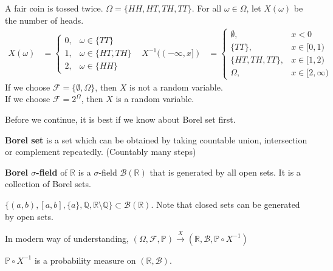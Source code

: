 \documentclass{huhtakm-template-book}
\newcommand{\prob}{\mathbb{P}}
\begin{document}
    \newpage
    \begin{eg}
        \label{Toss coin twice}
        A fair coin is tossed twice. $\Omega=\{HH,HT,TH,TT\}$. For all $\omega\in\Omega$, let $X(\omega)$ be the number of heads.
        \begin{align*}
            X(\omega)&=\begin{cases}
                0, &\omega\in\{TT\}\\
                1, &\omega\in\{HT,TH\}\\
                2, &\omega\in\{HH\}
            \end{cases} & X^{-1}((-\infty,x])&=\begin{cases}
                \emptyset, & x<0\\
                \{TT\}, & x\in[0,1)\\
                \{HT,TH,TT\}, & x\in[1,2)\\
                \Omega, &x\in[2,\infty)
            \end{cases}
        \end{align*}
        If we choose $\mathcal{F}=\{\emptyset,\Omega\}$, then $X$ is not a random variable.\\
        If we choose $\mathcal{F}=2^{\Omega}$, then $X$ is a random variable.
    \end{eg}
    Before we continue, it is best if we know about Borel set first.
    \begin{defn}
        \textbf{Borel set} is a set which can be obtained by taking countable union, intersection or complement repeatedly. (Countably many steps)
    \end{defn}
    \begin{defn}
        \textbf{Borel $\sigma$-field} of $\mathbb{R}$ is a $\sigma$-field $\mathcal{B}(\mathbb{R})$ that is generated by all open sets. It is a collection of Borel sets.
    \end{defn}
    \begin{eg}
        $\{(a,b),[a,b],\{a\},\mathbb{Q},\mathbb{R}\setminus\mathbb{Q}\}\subset\mathcal{B}(\mathbb{R})$. Note that closed sets can be generated by open sets.
    \end{eg}
    \begin{rem}
        In modern way of understanding, $(\Omega,\mathcal{F},\prob)\xrightarrow{X}(\mathbb{R},\mathcal{B},\prob\circ X^{-1})$
    \end{rem}
    \begin{cla}
        $\prob\circ X^{-1}$ is a probability measure on $(\mathbb{R},\mathcal{B})$.
    \end{cla}
\end{document}
